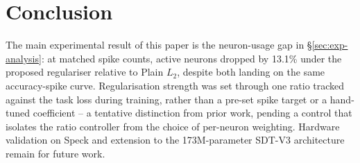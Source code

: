 \section{Conclusion}
\label{sec:conclusion}

The main experimental result of this paper is the neuron-usage gap in
\S\ref{sec:exp-analysis}: at matched spike counts, active neurons dropped by
13.1\% under the proposed regulariser relative to Plain $L_2$, despite both
landing on the same accuracy-spike curve.
Regularisation strength was set through one ratio tracked against the task
loss during training, rather than a pre-set spike target or a hand-tuned
coefficient -- a tentative distinction from prior work, pending a control
that isolates the ratio controller from the choice of per-neuron weighting.
Hardware validation on Speck and extension to the 173M-parameter SDT-V3
architecture remain for future work.

